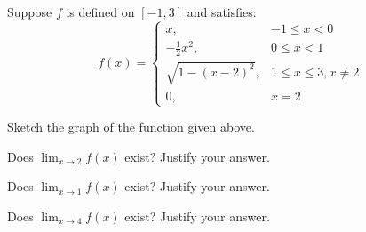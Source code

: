 \documentclass{hwset}
\begin{document}
\begin{problem}[1.] Suppose $f$ is defined on $[-1,3]$ and satisfies:
	\begin{equation*}
		f(x)=\begin{cases} x, &  -1 \leq x < 0 \\
			-\frac{1}{2}x^{2}, & 0 \leq x < 1 \\
    	\sqrt{1-(x-2)^{2}}, & 1 \leq x \leq 3, x \ne 2 \\
    	0, & x = 2
		\end{cases}
	\end{equation*}
	\be
		\item Sketch the graph of the function given above.
		\item Does $\lim_{x\to 2}f(x)$ exist? Justify your answer.
		\item Does $\lim_{x\to 1}f(x)$ exist? Justify your answer.
		\item Does $\lim_{x\to 4}f(x)$ exist? Justify your answer.
	\ee
\end{problem}
\end{document}
